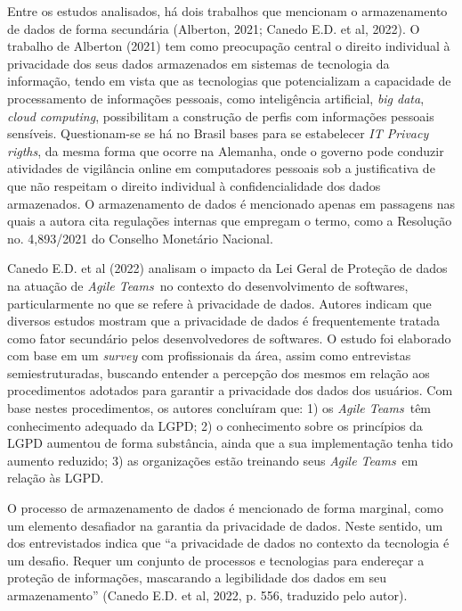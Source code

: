 Entre os estudos analisados, há dois trabalhos que mencionam o armazenamento de dados de forma secundária (Alberton, 2021; Canedo E.D. et al, 2022). O trabalho de Alberton (2021) tem como preocupação central o direito individual à privacidade dos seus dados armazenados em sistemas de tecnologia da informação, tendo em vista que as tecnologias que potencializam a capacidade de processamento de informações pessoais, como inteligência artificial, \textit{\textit{big data}}, \textit{\textit{cloud computing}}, possibilitam a construção de perfis com informações pessoais sensíveis. Questionam-se se há no Brasil bases para se estabelecer \textit{\textit{IT Privacy rigths}}, da mesma forma que ocorre na Alemanha, onde o governo pode conduzir atividades de vigilância online em computadores pessoais sob a justificativa de que não respeitam o direito individual à confidencialidade dos dados armazenados. O armazenamento de dados é mencionado apenas em passagens nas quais a autora cita regulações internas que empregam o termo, como a Resolução no. 4,893/2021 do Conselho Monetário Nacional. 

Canedo E.D. et al (2022) analisam o impacto da Lei Geral de Proteção de dados na atuação de \textit{\textit{Agile Teams}} no contexto do desenvolvimento de softwares, particularmente no que se refere à privacidade de dados. Autores indicam que diversos estudos mostram que a privacidade de dados é frequentemente tratada como fator secundário pelos desenvolvedores de softwares. O estudo foi elaborado com base em um \textit{\textit{survey }}com profissionais da área, assim como entrevistas semiestruturadas, buscando entender a percepção dos mesmos em relação aos procedimentos adotados para garantir a privacidade dos dados dos usuários. Com base nestes procedimentos, os autores concluíram que: 1) os \textit{\textit{Agile Teams}} têm conhecimento adequado da LGPD; 2) o conhecimento sobre os princípios da LGPD aumentou de forma substância, ainda que a sua implementação tenha tido aumento reduzido; 3) as organizações estão treinando seus \textit{\textit{Agile Teams}} em relação às LGPD. 

O processo de armazenamento de dados é mencionado de forma marginal, como um elemento desafiador na garantia da privacidade de dados. Neste sentido, um dos entrevistados indica que “a privacidade de dados no contexto da tecnologia é um desafio. Requer um conjunto de processos e tecnologias para endereçar a proteção de informações, mascarando a legibilidade dos dados em seu armazenamento” (Canedo E.D. et al, 2022, p. 556, traduzido pelo autor).

